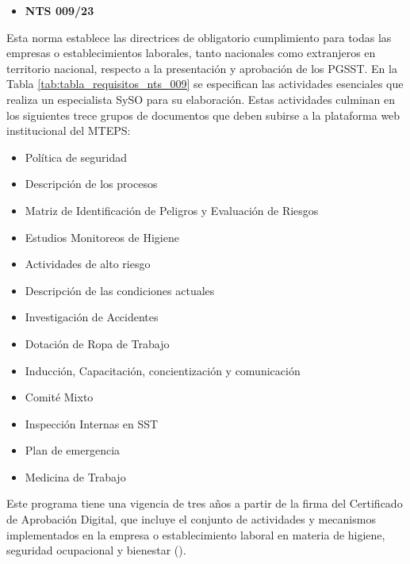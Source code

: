 \begin{samepage}
\begin{itemize} [wide=0pt, topsep=0pt] \item \textbf{NTS 009/23} \end{itemize}

\indent
Esta norma establece las directrices de obligatorio cumplimiento para todas las empresas o establecimientos laborales, tanto nacionales como extranjeros en territorio nacional, respecto a la presentación y aprobación de los PGSST. En la Tabla \ref{tab:tabla_requisitos_nts_009} se especifican las actividades esenciales que realiza un especialista SySO para su elaboración. Estas actividades culminan en los siguientes trece grupos de documentos que deben subirse a la plataforma web institucional del MTEPS:
\begin{itemize}[topsep=0pt, itemsep=0mm]
    \item Política de seguridad
    \item Descripción de los procesos
    \item Matriz de Identificación de Peligros y Evaluación de Riesgos
    \item Estudios Monitoreos de Higiene
    \item Actividades de alto riesgo
    \item Descripción de las condiciones actuales
    \item Investigación de Accidentes
    \item Dotación de Ropa de Trabajo
    \item Inducción, Capacitación, concientización y comunicación
    \item Comité Mixto
    \item Inspección Internas en SST
    \item Plan de emergencia
    \item Medicina de Trabajo
\end{itemize}

Este programa tiene una vigencia de tres años a partir de la firma del Certificado de Aprobación Digital, que incluye el conjunto de actividades y mecanismos implementados en la empresa o establecimiento laboral en materia de higiene, seguridad ocupacional y bienestar (\cite{NTS-009/23}).
\end{samepage}

